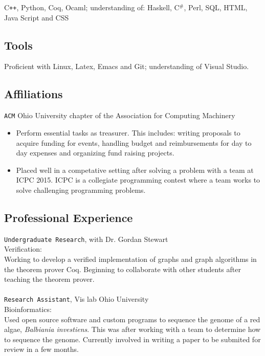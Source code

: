 \documentclass[11pt]{article} %
\begin{document}
C\texttt{++}, Python, Coq, Ocaml; understanding of: Haskell, C$^\texttt{\#}$, Perl, SQL, HTML, Java Script and CSS 
\subsection*{Tools}
Proficient with Linux, Latex, Emacs and Git; understanding of Visual Studio.


\subsection*{Affiliations}
\texttt{ACM} Ohio University chapter of the Association for Computing Machinery
\begin{itemize}
\item Perform essential tasks as treasurer. This includes: writing proposals to acquire funding for events, handling budget and reimbursements for day to day expenses and organizing fund raising projects.
\item Placed well in a competative setting after solving a problem with a team at ICPC 2015. ICPC is a collegiate programming contest where a team works to solve challenging programming problems. 
\end{itemize}
\subsection*{Professional Experience} 
\texttt{Undergraduate Research}, with Dr. Gordan Stewart \\
Verification: \\
Working to develop a verified implementation of graphs and graph algorithms in the theorem prover Coq.  Beginning to collaborate with other students after teaching the theorem prover.\\ \\
\texttt{Research Assistant}, Vis lab Ohio University \\
Bioinformatics: \\
Used open source software and custom programs to sequence the genome of a red algae,\textit{ Balbiania investiens}. This was after working with a team to determine how to sequence the genome. Currently involved in writing a paper to be submited for review in a few months.
           
\end{document}
